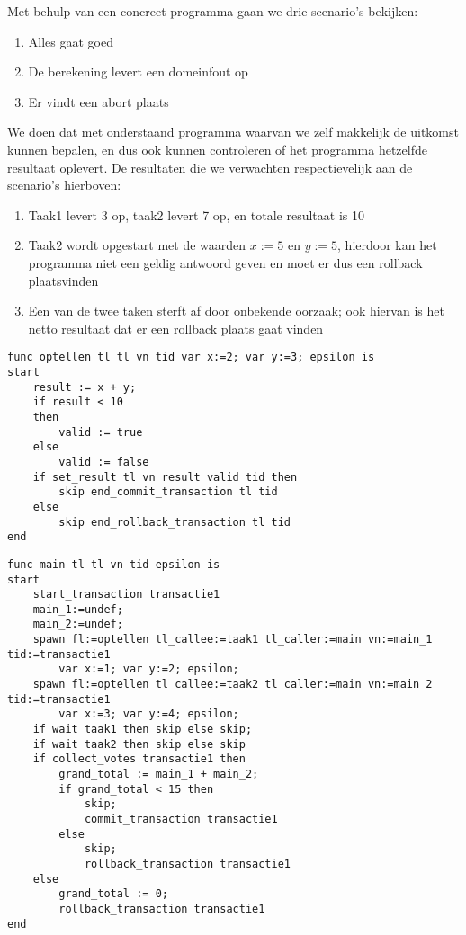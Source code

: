 
Met behulp van een concreet programma gaan we drie scenario's bekijken:
\begin{enumerate}
\item Alles gaat goed
\item De berekening levert een domeinfout op
\item Er vindt een abort plaats
\end{enumerate}

We doen dat met onderstaand programma waarvan we zelf makkelijk de uitkomst kunnen bepalen, en dus ook kunnen
controleren of het programma hetzelfde resultaat oplevert. De resultaten die we verwachten respectievelijk aan de
scenario's hierboven:
\begin{enumerate}
\item Taak1 levert 3 op, taak2 levert 7 op, en totale resultaat is 10
\item Taak2 wordt opgestart met de waarden \(x:=5\) en \(y:=5\), hierdoor kan het programma niet een geldig antwoord
geven en moet er dus een rollback plaatsvinden
\item Een van de twee taken sterft af door onbekende oorzaak; ook hiervan is het netto resultaat dat er een rollback
plaats gaat vinden
\end{enumerate}

\begin{lstlisting}[caption={Optellen}]
func optellen tl tl vn tid var x:=2; var y:=3; epsilon is
start
	result := x + y;
	if result < 10
	then
		valid := true
	else
		valid := false
	if set_result tl vn result valid tid then
		skip end_commit_transaction tl tid
	else
		skip end_rollback_transaction tl tid
end
\end{lstlisting}
\begin{lstlisting}[caption={Main}]
func main tl tl vn tid epsilon is
start
	start_transaction transactie1
	main_1:=undef;
	main_2:=undef;
	spawn fl:=optellen tl_callee:=taak1 tl_caller:=main vn:=main_1 tid:=transactie1
		var x:=1; var y:=2; epsilon;
	spawn fl:=optellen tl_callee:=taak2 tl_caller:=main vn:=main_2 tid:=transactie1
		var x:=3; var y:=4; epsilon;
	if wait taak1 then skip else skip;
	if wait taak2 then skip else skip
	if collect_votes transactie1 then
		grand_total := main_1 + main_2;
		if grand_total < 15 then
			skip;
			commit_transaction transactie1
		else
			skip;
			rollback_transaction transactie1
	else
		grand_total := 0;
		rollback_transaction transactie1
end
\end{lstlisting}

